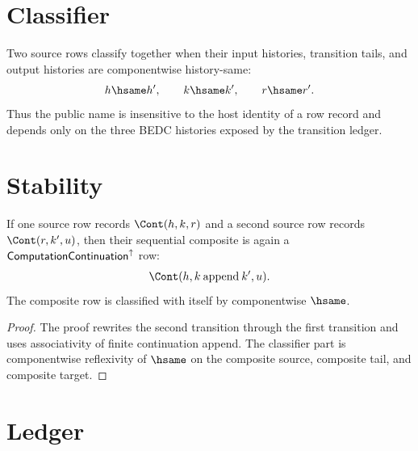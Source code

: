 \section{Classifier}
\label{sec:concrete-instances-computation-as-continuation-classifier}

\begin{definition}
\label{def:concrete-instances-computation-as-continuation-classifier}
Two source rows classify together when their input histories, transition tails,
and output histories are componentwise history-same:
$$
\begin{aligned}
  h\hsame h',
  \qquad
  k\hsame k',
  \qquad
  r\hsame r'.
\end{aligned}
$$
Thus the public name is insensitive to the host identity of a row record and
depends only on the three BEDC histories exposed by the transition ledger.
\end{definition}

\section{Stability}
\label{sec:concrete-instances-computation-as-continuation-stability}

\begin{theorem}
\label{thm:concrete-instances-computation-as-continuation-stability}
If one source row records $\Cont(h,k,r)$ and a second source row records
$\Cont(r,k',u)$, then their sequential composite is again a
$\mathsf{ComputationContinuation}^{\uparrow}$ row:
$$
\begin{aligned}
  \Cont(h,k\mathbin{\mathrm{append}}k',u).
\end{aligned}
$$
The composite row is classified with itself by componentwise $\hsame$.
\end{theorem}

\begin{proof}
The proof rewrites the second transition through the first transition and uses
associativity of finite continuation append.  The classifier part is
componentwise reflexivity of $\hsame$ on the composite source, composite tail,
and composite target.
\end{proof}

\section{Ledger}
\label{sec:concrete-instances-computation-as-continuation-ledger}

